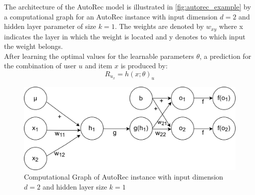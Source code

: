 The architecture of the AutoRec model is illustrated in \autoref{fig:autorec_example} by a computational graph for an AutoRec instance with input dimension $d = 2$ and hidden layer parameter of size $k=1$. The weights are denoted by $w_{xy}$ where x indicates the layer in which the weight is located and y denotes to which input the weight belongs.\\
After learning the optimal values for the learnable parameters $\theta$, a prediction for the combination of user $u$ and item $x$ is produced by:\\
\begin{equation}
    R_u_x = h(x; \theta)_u
\end{equation}

\begin{figure}[!ht]
    \centering
    \includegraphics[width=1\textwidth]{images/computational_graph.jpg}
    \caption{Computational Graph of AutoRec instance with input dimension $d=2$ and hidden layer size $k=1$}
    \label{fig:autorec_example}
\end{figure}

